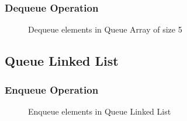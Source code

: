 \subsubsection*{Dequeue Operation}
\begin{figure}[H]
	\centering
	\qquad
	\caption{Dequeue elements in Queue Array of size 5}\label{fig:queue_arr_dequeue}
\end{figure}

\pagebreak
\subsection{Queue Linked List}
\subsubsection*{Enqueue Operation}
\begin{figure}[H]
        \centering
	\caption{Enqueue elements in Queue Linked List}\label{fig:queue_ll_enqueue}
\end{figure}
